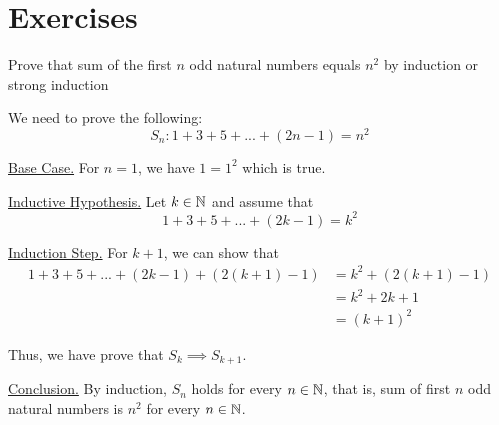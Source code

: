 \section*{Exercises}

\bp Prove that sum of the first $n$ odd natural numbers equals $n^2$ by induction or strong induction \ep

\bs 
We need to prove the following:
$$S_n : 1 + 3 + 5 + ... + (2n-1) = n^2$$

\underline{Base Case.} For $n = 1$, we have $1 = 1^2$ which is true.

\underline{Inductive Hypothesis.} Let $k \in \mathbb{N}$ and assume that 
$$1 + 3 + 5 + ... + (2k - 1) = k^2$$

\underline{Induction Step.} For $k+1$, we can show that 
\begin{align*}
	1 + 3 + 5 + ... + (2k - 1) + (2(k+1) - 1)
		&= k^2 + (2(k+1)-1) \\
		&= k^2 + 2k + 1 \\
		&= (k+1)^2
\end{align*}

Thus, we have prove that $S_k \implies S_{k+1}$.

\underline{Conclusion.} By induction, $S_n$ holds for every $n \in \mathbb{N}$, that is, sum of first $n$ odd natural numbers is $n^2$ for every $n \in \mathbb{N}$.
\es


